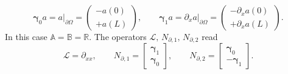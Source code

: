 \begin{equation}
	\bm\gamma_0 a = a\vert_{\partial\Omega} = \begin{pmatrix}
	-a(0) \\ +a(L)
	\end{pmatrix}, \qquad \bm\gamma_1 a = \partial_x a\vert_{\partial\Omega} = \begin{pmatrix}
	-\partial_x a(0) \\ +\partial_x a(L)
	\end{pmatrix}.
\end{equation}
In this case $\mathbb{A} = \mathbb{B} = \mathbb{R}$. The operators $\mathcal{L}, \, N_{\partial, 1}, \, N_{\partial, 2}$ read
\begin{equation}
\mathcal{L} = \partial_{xx}, \qquad 
N_{\partial, 1} = \begin{bmatrix}
\bm\gamma_1 \\ \bm\gamma_0
\end{bmatrix}, \qquad 
N_{\partial, 2} = \begin{bmatrix}
\bm\gamma_0 \\ -\bm\gamma_1
\end{bmatrix}.
\end{equation}

